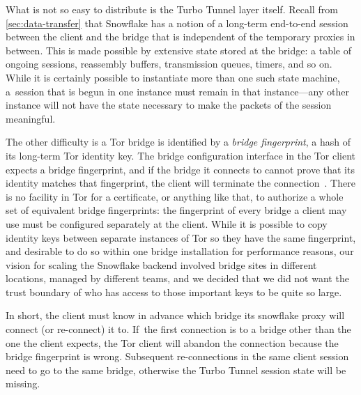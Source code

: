 \documentclass[letterpaper,twocolumn]{article}
\newcommand{\firstterm}[1]{\textit{#1}}
\begin{document}
What is not so easy to distribute
is the Turbo Tunnel layer itself.
Recall from \autoref{sec:data-transfer} that Snowflake
has a notion of a long-term end-to-end session
between the client and the bridge that is independent of
the temporary proxies in between.
This is made possible by extensive state stored at the bridge:
a table of ongoing sessions, reassembly buffers,
transmission queues, timers, and so on.
While it is certainly possible to instantiate more than one such state machine,
a~session that is begun in one instance must remain in that instance---any
other instance will not have the state necessary to make the packets
of the session meaningful.

The other difficulty is a Tor bridge is identified
by a \firstterm{bridge fingerprint},
a hash of its long-term Tor identity key.
The bridge configuration interface in the Tor client
expects a bridge fingerprint,
and if the bridge it connects to cannot prove that
its identity matches that fingerprint,
the client will terminate the connection~\cite[\S 5.1.2]{tor-spec}.
There is no facility in Tor for a certificate,
or anything like that,
to authorize a whole set of equivalent bridge fingerprints:
the fingerprint of every bridge a client may use
must be configured separately at the client.
While it is possible to copy identity keys between
separate instances of Tor so they have the same fingerprint,
and desirable to do so within one bridge installation for performance reasons,
our vision for scaling the Snowflake backend
involved bridge sites in different locations,
managed by different teams,
and we decided that we did not want the trust boundary
of who has access to those important keys to be quite so large.

In short, the client must know in advance which bridge
its snowflake proxy will connect (or re-connect) it to.
If~the first connection is to a bridge other than the one the client expects,
the Tor client will abandon the connection because the bridge fingerprint is wrong.
Subsequent re-connections in the same client session
need to go to the same bridge,
otherwise the Turbo Tunnel session state will be missing.
\end{document}
